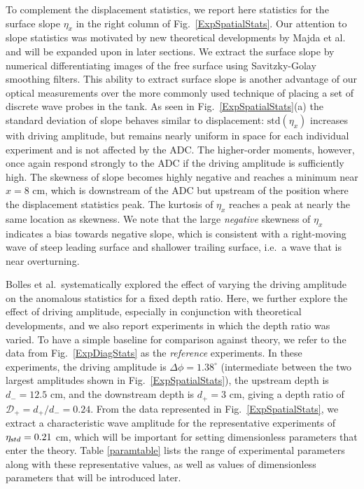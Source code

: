 \documentclass[11pt]{article}
\newcommand{\etastd}{\eta_{\text std}}
\newcommand{\depth}{d}
\newcommand{\dup}{\depth_{-}}
\newcommand{\ddn}{\depth_{+}}
\newcommand{\drat}{\mathcal{D}}
\newcommand{\dratdn}{\drat_+}
\newcommand{\std}{\text{std}}
\newcommand{\Dphi}{\Delta \phi}
\begin{document}
	To complement the displacement statistics, we report here statistics for the surface slope $\eta_x$ in the right column of Fig.~\ref{ExpSpatialStats}. Our attention to slope statistics was motivated by new theoretical developments by Majda et al.~\cite{majda2019} and will be expanded upon in later sections. We extract the surface slope by numerical differentiating images of the free surface using Savitzky-Golay smoothing filters. This ability to extract surface slope is another advantage of our optical measurements over the more commonly used technique of placing a set of discrete wave probes in the tank. As seen in Fig.~\ref{ExpSpatialStats}(a) the standard deviation of slope behaves similar to displacement: $\std(\eta_x)$ increases with driving amplitude, but remains nearly uniform in space for each individual experiment and is not affected by the ADC. The higher-order moments, however, once again respond strongly to the ADC if the driving amplitude is sufficiently high. The skewness of slope becomes highly negative and reaches a minimum near $x = 8$ cm, which is downstream of the ADC but upstream of the position where the displacement statistics peak. The kurtosis of $\eta_x$ reaches a peak at nearly the same location as skewness. We note that the large {\em negative} skewness of $\eta_x$ indicates a bias towards negative slope, which is consistent with a right-moving wave of steep leading surface and shallower trailing surface, i.e.~a wave that is near overturning.

	Bolles et al.~systematically explored the effect of varying the driving amplitude on the anomalous statistics for a fixed depth ratio. Here, we further explore the effect of driving amplitude, especially in conjunction with theoretical developments, and we also report experiments in which the depth ratio was varied. To have a simple baseline for comparison against theory, we refer to the data from Fig.~\ref{ExpDiagStats} as the {\em reference} experiments. In these experiments, the driving amplitude is $\Dphi = 1.38^{\circ}$ (intermediate between the two largest amplitudes shown in Fig.~\ref{ExpSpatialStats}), the upstream depth is $\dup = 12.5$ cm, and the downstream depth is $\ddn = 3$ cm, giving a depth ratio of $\dratdn = \ddn/\dup= 0.24$. From the data represented in Fig.~\ref{ExpSpatialStats}, we extract a characteristic wave amplitude for the representative experiments of $\etastd = 0.21$ cm, which will be important for setting dimensionless parameters that enter the theory. Table \ref{paramtable} lists the range of experimental parameters along with these representative values, as well as values of dimensionless parameters that will be introduced later.
\end{document}
